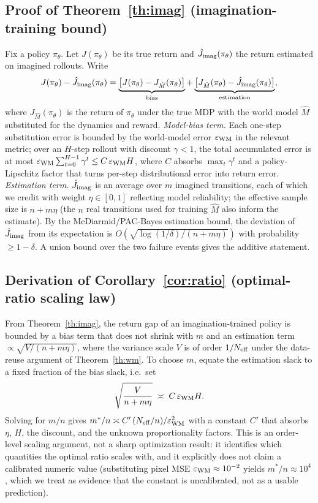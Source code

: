\documentclass[sigconf,anonymous]{acmart}
\begin{document}
\subsection{Proof of Theorem~\ref{th:imag} (imagination-training bound)}
Fix a policy $\pi_\theta$. Let $J(\pi_\theta)$ be its true return and
$\hat J_{\rm imag}(\pi_\theta)$ the return estimated on imagined rollouts.
Write
\[
  J(\pi_\theta)-\hat J_{\rm imag}(\pi_\theta)
  = \underbrace{\big[J(\pi_\theta)-J_{\hat M}(\pi_\theta)\big]}_{\text{bias}}
    + \underbrace{\big[J_{\hat M}(\pi_\theta)-\hat J_{\rm imag}(\pi_\theta)\big]}_{\text{estimation}},
\]
where $J_{\hat M}(\pi_\theta)$ is the return of $\pi_\theta$ under the true
MDP with the world model $\hat M$ substituted for the dynamics and reward.
\emph{Model-bias term.} Each one-step substitution error is bounded by the
world-model error $\varepsilon_{\rm WM}$ in the relevant metric; over an
$H$-step rollout with discount $\gamma<1$, the total accumulated error is at
most
$\varepsilon_{\rm WM}\sum_{t=0}^{H-1}\gamma^t\le C\,\varepsilon_{\rm WM}H$,
where $C$ absorbs $\max_t\gamma^t$ and a policy-Lipschitz factor that turns
per-step distributional error into return error. \emph{Estimation term.}
$\hat J_{\rm imag}$ is an average over $m$ imagined transitions, each of
which we credit with weight $\eta\in[0,1]$ reflecting model reliability; the
effective sample size is $n+m\eta$ (the $n$ real transitions used for
training $\hat M$ also inform the estimate). By the McDiarmid/PAC-Bayes
estimation bound, the deviation of $\hat J_{\rm imag}$ from its expectation
is $O(\sqrt{\log(1/\delta)/(n+m\eta)})$ with probability $\ge1-\delta$. A
union bound over the two failure events gives the additive statement.

\subsection{Derivation of Corollary~\ref{cor:ratio} (optimal-ratio scaling law)}
From Theorem~\ref{th:imag}, the return gap of an imagination-trained policy
is bounded by a bias term that does not shrink with $m$ and an estimation
term $\propto\sqrt{V/(n+m\eta)}$, where the variance scale $V$ is of order
$1/N_{\rm eff}$ under the data-reuse argument of Theorem~\ref{th:wm}. To
choose $m$, equate the estimation slack to a fixed fraction of the bias
slack, i.e.\ set
\[
  \sqrt{\frac{V}{n+m\eta}}\;\asymp\;C\,\varepsilon_{\rm WM}H.
\]
Solving for $m/n$ gives $m^*/n\asymp C'\,(N_{\rm eff}/n)/\varepsilon_{\rm WM}^2$
with a constant $C'$ that absorbs $\eta$, $H$, the discount, and the unknown
proportionality factors. This is an order-level scaling argument, not a
sharp optimization result: it identifies which quantities the optimal ratio
scales with, and it explicitly does not claim a calibrated numeric value
(substituting pixel MSE $\varepsilon_{\rm WM}\approx10^{-2}$ yields
$m^*/n\approx10^4$, which we treat as evidence that the constant is
uncalibrated, not as a usable prediction).
\end{document}
